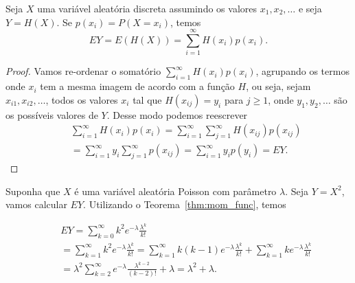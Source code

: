%
\begin{frame}
%
%
\begin{teo} \label{thm:mom_func} Seja $X$ uma variável aleatória discreta assumindo os valores $x_1,x_2,\ldots$ e
seja $Y=H(X)$. Se $p(x_i)=P(X=x_i)$, temos $$EY=E(H(X))=\sum_{i=1}^{\infty}H(x_i)p(x_i).$$ \end{teo}
%
%
%
%
\begin{proof} 
Vamos re-ordenar o somatório $\sum_{i=1}^{\infty}H(x_i)p(x_i)$,
agrupando os termos onde $x_i$ tem a mesma imagem de acordo com a
função $H$, ou seja, sejam $x_{i1},x_{i2},\ldots$, todos os valores
$x_i$ tal que $H(x_{ij})=y_i$ para $j\geq 1$, onde $y_1,y_2,\ldots$
são os possíveis valores de $Y$. Desse modo podemos reescrever
\begin{eqnarray}
& & \sum_{i=1}^{\infty}H(x_i)p(x_i)=\sum_{i=1}^{\infty}\sum_{j=1}^{\infty}H(x_{ij})p(x_{ij})
\nonumber\\
& & =\sum_{i=1}^{\infty}y_i\sum_{j=1}^{\infty}p(x_{ij})=\sum_{i=1}^{\infty}y_ip(y_i)=EY.\nonumber
\end{eqnarray}
\end{proof}
%
%
\end{frame}
%
\begin{frame}
%
%
\begin{exem}
Suponha que $X$ é uma variável aleatória Poisson com parâmetro
$\lambda$. Seja $Y=X^2$, vamos calcular $EY$. Utilizando o
Teorema~\ref{thm:mom_func}, temos

\begin{eqnarray}
& &
EY=\sum_{k=0}^{\infty}k^2e^{-\lambda}\frac{\lambda^k}{k!}\nonumber\\
& & =\sum_{k=1}^{\infty}k^2e^{-\lambda}\frac{\lambda^k}{k!}=\sum_{k=1}^{\infty}k(k-1)e^{-\lambda}\frac{\lambda^k}{k!}+\sum_{k=1}^{\infty}ke^{-\lambda}\frac{\lambda^k}{k!}
\nonumber \\
&
&=\lambda^2\sum_{k=2}^{\infty}e^{-\lambda}\frac{\lambda^{k-2}}{(k-2)!}+\lambda=\lambda^2+\lambda.\nonumber
\end{eqnarray}
\end{exem}

\end{frame}
